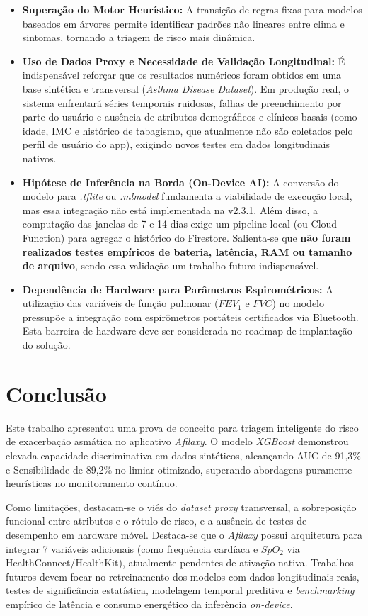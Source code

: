 \documentclass[12pt]{article}
\begin{document}
\begin{itemize}
    \item \textbf{Superação do Motor Heurístico:} A transição de regras fixas para modelos baseados em árvores permite identificar padrões não lineares entre clima e sintomas, tornando a triagem de risco mais dinâmica.
    \item \textbf{Uso de Dados Proxy e Necessidade de Validação Longitudinal:} É indispensável reforçar que os resultados numéricos foram obtidos em uma base sintética e transversal (\textit{Asthma Disease Dataset}). Em produção real, o sistema enfrentará séries temporais ruidosas, falhas de preenchimento por parte do usuário e ausência de atributos demográficos e clínicos basais (como idade, IMC e histórico de tabagismo, que atualmente não são coletados pelo perfil de usuário do app), exigindo novos testes em dados longitudinais nativos.
    \item \textbf{Hipótese de Inferência na Borda (On-Device AI):} A conversão do modelo para \textit{.tflite} ou \textit{.mlmodel} fundamenta a viabilidade de execução local, mas essa integração não está implementada na v2.3.1. Além disso, a computação das janelas de 7 e 14 dias exige um pipeline local (ou Cloud Function) para agregar o histórico do Firestore. Salienta-se que \textbf{não foram realizados testes empíricos de bateria, latência, RAM ou tamanho de arquivo}, sendo essa validação um trabalho futuro indispensável.
    \item \textbf{Dependência de Hardware para Parâmetros Espirométricos:} A utilização das variáveis de função pulmonar ($FEV_1$ e $FVC$) no modelo pressupõe a integração com espirômetros portáteis certificados via Bluetooth. Esta barreira de hardware deve ser considerada no roadmap de implantação do solução.
\end{itemize}

\section{Conclusão} \label{sec:conclusao}

Este trabalho apresentou uma prova de conceito para triagem inteligente do risco de exacerbação asmática no aplicativo \textit{Afilaxy}. O modelo \textit{XGBoost} demonstrou elevada capacidade discriminativa em dados sintéticos, alcançando AUC de 91,3\% e Sensibilidade de 89,2\% no limiar otimizado, superando abordagens puramente heurísticas no monitoramento contínuo.

Como limitações, destacam-se o viés do \textit{dataset proxy} transversal, a sobreposição funcional entre atributos e o rótulo de risco, e a ausência de testes de desempenho em hardware móvel. Destaca-se que o \textit{Afilaxy} possui arquitetura para integrar 7 variáveis adicionais (como frequência cardíaca e $SpO_2$ via HealthConnect/HealthKit), atualmente pendentes de ativação nativa. Trabalhos futuros devem focar no retreinamento dos modelos com dados longitudinais reais, testes de significância estatística, modelagem temporal preditiva e \textit{benchmarking} empírico de latência e consumo energético da inferência \textit{on-device}.




\end{document}

